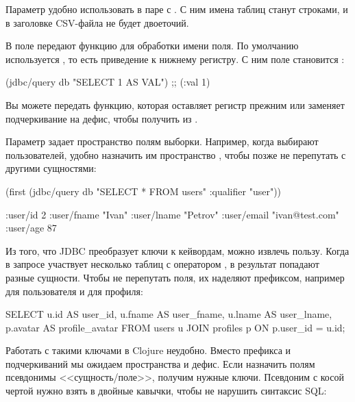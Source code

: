 Параметр удобно использовать в паре с . С ним имена таблиц станут строками, и в заголовке CSV-файла не будет двоеточий.

В поле  передают функцию для обработки имени поля. По умолчанию используется , то есть приведение к нижнему регистру. С ним поле  становится :

\begin{english}
  \begin{clojure}
(jdbc/query db "SELECT 1 AS VAL")
;; ({:val 1})
  \end{clojure}
\end{english}

Вы можете передать функцию, которая оставляет регистр прежним или заменяет подчеркивание на дефис, чтобы получить  из .

Параметр  задает пространство полям выборки. Например, когда выбирают пользователей, удобно назначить им пространство , чтобы позже не перепутать с другими сущностями:

\begin{english}
  \begin{clojure}
(first (jdbc/query db "SELECT * FROM users"
                      {:qualifier "user"}))

{:user/id 2
 :user/fname "Ivan"
 :user/lname "Petrov"
 :user/email "ivan@test.com"
 :user/age 87}
  \end{clojure}
\end{english}

Из того, что JDBC преобразует ключи к кейвордам, можно извлечь пользу. Когда в запросе участвует несколько таблиц с оператором , в результат попадают разные сущности. Чтобы не перепутать поля, их наделяют префиксом, например  для пользователя и  для профиля:

\begin{english}
  \begin{sql}
SELECT
  u.id     AS user_id,
  u.fname  AS user_fname,
  u.lname  AS user_lname,
  p.avatar AS profile_avatar
FROM users u
JOIN profiles p ON p.user_id = u.id;
  \end{sql}
\end{english}

Работать с такими ключами в Clojure неудобно. Вместо префикса и подчеркиваний мы ожидаем пространства и дефис. Если назначить полям псевдонимы <<сущность/поле>>, получим нужные ключи. Псевдоним с косой чертой нужно взять в двойные кавычки, чтобы не нарушить синтаксис SQL:

